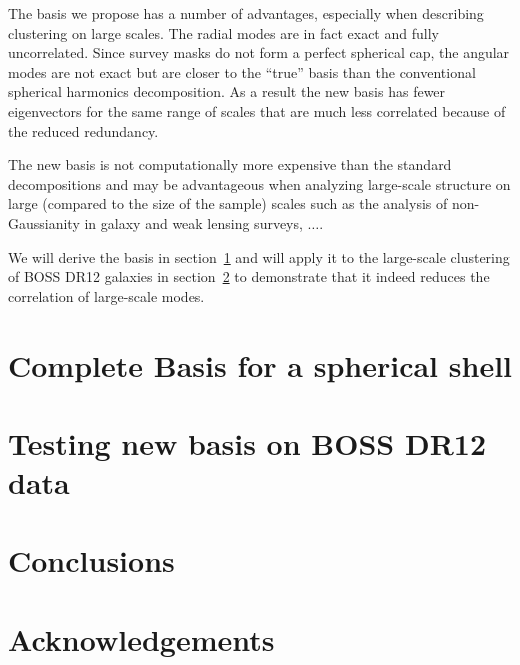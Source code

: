 \documentclass[fleqn,usenatbib]{mnras}
\begin{document}
The basis we propose has a number of advantages, especially when describing
clustering on large scales. The radial modes are in fact exact and fully
uncorrelated. Since survey masks do not form a perfect spherical cap, the angular
modes are not exact but are closer to the ``true'' basis than the conventional
spherical harmonics decomposition. As a result the new basis has fewer
eigenvectors for the same range of scales that are much less correlated because of
the reduced redundancy.

The new basis is not computationally more expensive than the standard
decompositions and may be advantageous when analyzing large-scale structure on
large (compared to the size of the sample) scales such as the analysis of
non-Gaussianity in galaxy and weak lensing surveys, $\ldots$.

We will derive the basis in section~\ref{sec:basis} and will apply it to the
large-scale clustering of BOSS DR12 galaxies in section~\ref{sec:data} to
demonstrate that it indeed reduces the correlation of large-scale modes.

\section{Complete Basis for a spherical shell}
\label{sec:basis}

\section{Testing new basis on BOSS DR12 data}
\label{sec:data}

\section{Conclusions}
\label{sec:conclusions}

\section*{Acknowledgements}




%


\begin{thebibliography}{99}
\end{thebibliography}



\appendix



\bsp	%
\label{lastpage}
\end{document}
